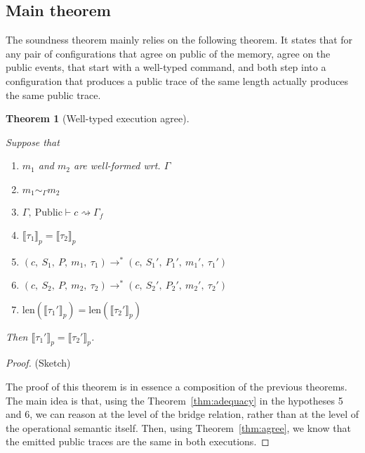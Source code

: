 \documentclass[10pt]{article}
\newcommand{\ctx}{\Gamma}
\newcommand{\typing}[4]{ #1,~#2 \vdash #3 \rightsquigarrow #4}
\newcommand{\exectrans}[2] { #1 \rightarrow^{*} #2 }
\newcommand{\pproj}[1]{\llbracket #1 \rrbracket_{p}}
\newcommand{\agree}[3]{#2 \sim_{#1} #3}
\newtheorem{theorem}{Theorem}
\begin{document}


\subsection{Main theorem}%
\label{subsec:main_theorem}

The soundness theorem mainly relies on the following theorem. It states that for
any pair of configurations that agree on public of the memory, agree on the public events,
that start with a well-typed command, and both step into a configuration that produces a
public trace of the same length actually produces the same public trace.

\begin{theorem}[Well-typed execution agree]\label{thm:sound}

Suppose that

\begin{enumerate}
  \item $m_{1}$ and $m_{2}$ are well-formed wrt. $\ctx$
  \item $\agree{\ctx}{m_{1}}{m_{2}}$
  \item \( \typing{\ctx}{\mathrm{Public}}{c}{\ctx_{f}}\)
  \item $\pproj{\tau_{1}} = \pproj{\tau_{2}}$
  \item \(
        \exectrans
        {(c,~S_{1},~P,~m_{1},~\tau_{1})}
        {(c,~S_{1}',~P_{1}',~m_{1}',~\tau_{1}')}
        \)
  \item \(
        \exectrans
        {(c,~S_{2},~P,~m_{2},~\tau_{2})}
        {(c,~S_{2}',~P_{2}',~m_{2}',~\tau_{2}')}
        \)
  \item $\mathrm{len}(\pproj{\tau_{1}'}) = \mathrm{len}(\pproj{\tau_{2}'})$
\end{enumerate}

Then $\pproj{\tau_{1}'} = \pproj{\tau_{2}'}$.
\end{theorem}


\begin{proof} (Sketch)

  The proof of this theorem is in essence a composition of the previous theorems. The main idea is
  that, using the Theorem~\ref{thm:adequacy} in the hypotheses 5 and 6, we can reason at the level
  of the bridge relation, rather than at the level of the operational semantic itself.
  Then, using Theorem~\ref{thm:agree}, we know that the emitted public traces are the same in both
  executions.

\end{proof}
\end{document}
